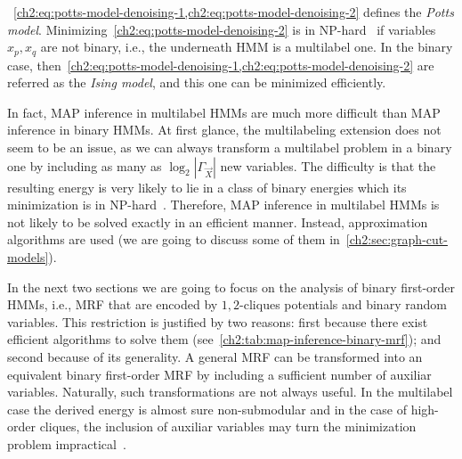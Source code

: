~\cref{ch2:eq:potts-model-denoising-1,ch2:eq:potts-model-denoising-2} defines the \emph{Potts model}. Minimizing~\cref{ch2:eq:potts-model-denoising-2} is in NP-hard~\cite{boykov01fast} if variables $x_p,x_q$ are not binary, i.e., the underneath HMM is a multilabel one. In the binary case, then~\cref{ch2:eq:potts-model-denoising-1,ch2:eq:potts-model-denoising-2} are referred as the \emph{Ising model}, and this one can be minimized efficiently.

In fact, MAP inference in multilabel HMMs are much more difficult than MAP inference in binary HMMs. At first glance, the multilabeling extension does not seem to be an issue, as we can always transform a multilabel problem in a binary one by including as many as $\log_2 |\Gamma_{\vec{X}}|$ new variables. The difficulty is that the resulting energy is very likely to lie in a class of binary energies which its minimization is in NP-hard~\cite{ramalingam08}. Therefore, MAP inference in multilabel HMMs is not likely to be solved exactly in an efficient manner. Instead, approximation algorithms are used (we are going to discuss some of them in~\cref{ch2:sec:graph-cut-models}).

In the next two sections we are going to focus on the analysis of binary first-order HMMs, i.e., MRF that are encoded by $1,2$-cliques potentials and binary random variables. This restriction is justified by two reasons: first because there exist efficient algorithms to solve them (see~\cref{ch2:tab:map-inference-binary-mrf}); and second because of its generality. A general MRF can be transformed into an equivalent binary first-order MRF by including a sufficient number of auxiliar variables. Naturally, such transformations are not always useful. In the multilabel case the derived energy is almost sure non-submodular and in the case of high-order cliques, the inclusion of auxiliar variables may turn the minimization problem impractical~\cite{ishikawa10}.



